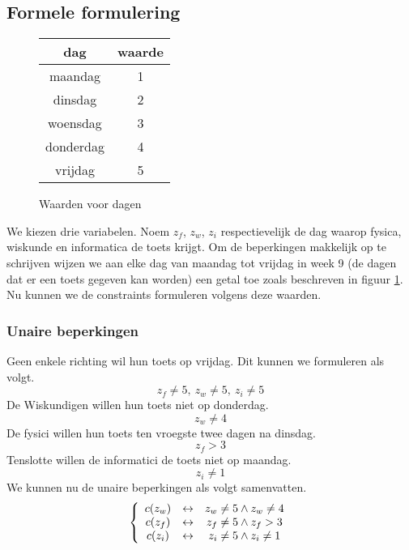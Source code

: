 \documentclass[alternative-exam.tex]{subfiles}
\begin{document}
\subsection{Formele formulering}
\begin{figure}[H]
\centering
\caption{Waarden voor dagen}
\label{waarde_dagen}
\begin{tabular}{| c | c | }
\hline
dag & waarde\\
\hline
maandag & 1\\
dinsdag & 2\\
woensdag & 3\\
donderdag & 4\\
vrijdag & 5\\
\hline
\end{tabular}
\end{figure}
We kiezen drie variabelen. Noem $z_f$, $z_w$, $z_i$ respectievelijk de dag waarop fysica, wiskunde en informatica de toets krijgt. Om de beperkingen makkelijk op te schrijven wijzen we aan elke dag van maandag tot vrijdag in week 9 (de dagen dat er een toets gegeven kan worden) een getal toe zoals beschreven in figuur \ref{waarde_dagen}.
Nu kunnen we de constraints formuleren volgens deze waarden.

\subsubsection{Unaire beperkingen}
Geen enkele richting wil hun toets op vrijdag. Dit kunnen we formuleren als volgt.
\[z_f \neq 5,\ z_w \neq 5,\ z_i \neq 5\]
De Wiskundigen willen hun toets niet op donderdag.
\[
z_w \neq 4
\]
De fysici willen hun toets ten vroegste twee dagen na dinsdag.
\[
z_f > 3
\]
Tenslotte willen de informatici de toets niet op maandag.
\[
z_i \neq 1
\]
We kunnen nu de unaire beperkingen als volgt samenvatten.
\[
\left\lbrace
\begin{array}{c c c}
c(z_w) & \leftrightarrow & z_w \neq 5 \wedge z_w \neq 4\\
c(z_f) & \leftrightarrow & z_f \neq 5 \wedge z_f > 3\\
c(z_i) & \leftrightarrow & z_i \neq 5 \wedge z_i \neq 1\\
\end{array}
\right.
\]
\end{document}
